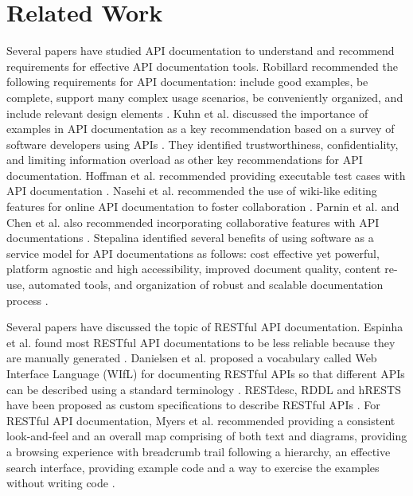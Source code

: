\section{Related Work}
Several papers have studied API documentation to understand and recommend requirements for effective API documentation tools. Robillard recommended the following requirements for API documentation: include good examples, be complete, support many complex usage scenarios, be conveniently organized, and include relevant design elements \cite{Robillard_what_makes, Robillard_a_field_study}. Kuhn et al. discussed the importance of examples in API documentation as a key recommendation based on a survey of software developers using APIs \cite{Kuhn_on_designing}. They identified trustworthiness, confidentiality, and limiting information overload as other key recommendations for API documentation. Hoffman et al. recommended providing executable test cases with API documentation \cite{Hoffman_api_documentation}. Nasehi et al. recommended the use of wiki-like editing features for online API documentation to foster collaboration \cite{Nasehi_what_makes}. Parnin et al. and Chen et al. also recommended incorporating collaborative features with API documentations \cite{Parnin_measuring, Chen_who_asked}. Stepalina identified several benefits of using software as a service model for API documentations as follows: cost effective yet powerful, platform agnostic and high accessibility, improved document quality, content re-use, automated tools, and organization of robust and scalable documentation process \cite{Stepalina_saas}.

Several papers have discussed the topic of RESTful API documentation. Espinha et al. found most RESTful API documentations to be less reliable because they are manually generated \cite{Espinha_web}. Danielsen et al. proposed a vocabulary called Web Interface Language (WIfL) for documenting RESTful APIs so that different APIs can be described using a standard terminology \cite{Danielsen_validation}. RESTdesc, RDDL and hRESTS have been proposed as custom specifications to describe RESTful APIs \cite{Verborgh_functional, Mangler_rddl, Kopecky_hrests}. For RESTful API documentation, Myers et al. recommended providing a consistent look-and-feel and an overall map comprising of both text and diagrams, providing a browsing experience with breadcrumb trail following a hierarchy, an effective search interface, providing example code and a way to exercise the examples without writing code \cite{Myers_study}.

